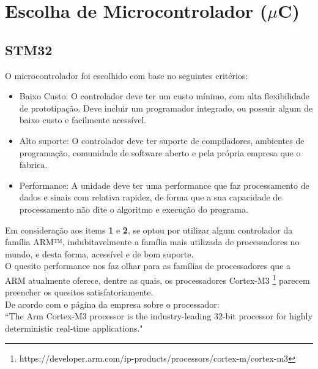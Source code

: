 \documentclass[11pt,a4paper]{report}
\begin{document}
\section{Escolha de Microcontrolador ($\mu$C)}
	\subsection{STM32}
	O microcontrolador foi escolhido com base no seguintes critérios:
	
	\begin{itemize}
		\item[{\bf 1.)}]Baixo Custo: O controlador deve ter um custo mínimo, com alta flexibilidade de prototipação. Deve incluir um programador integrado, ou possuir algum de baixo custo e facilmente acessível.
		
		\item[{\bf 2.)}]Alto suporte: O controlador deve ter suporte de compiladores, ambientes de programação, comunidade de software aberto e pela própria empresa que o fabrica.
		
		\item[{\bf 3.)}]Performance: A unidade deve ter uma performance que faz processamento de dados e sinais com relativa rapidez, de forma que a sua capacidade de processamento não dite o algoritmo e execução do programa.
	
	\end{itemize}

	Em consideração aos items {\bf 1} e {\bf 2}, se optou por utilizar algum controlador da família ARM™, indubitavelmente a família mais utilizada de processadores no mundo, e desta forma, acessível e de bom suporte. \\
	
	O quesito performance nos faz olhar para as famílias de processadores que a ARM atualmente oferece, dentre as quais, os processadores Cortex-M3 \footnote{https://developer.arm.com/ip-products/processors/cortex-m/cortex-m3} parecem preencher os quesitos satisfatoriamente. \\
	
	De acordo com o página da empresa sobre o processador:\\
	
	``The Arm Cortex-M3 processor is the industry-leading 32-bit processor for highly deterministic real-time applications."\\
	
\end{document}
